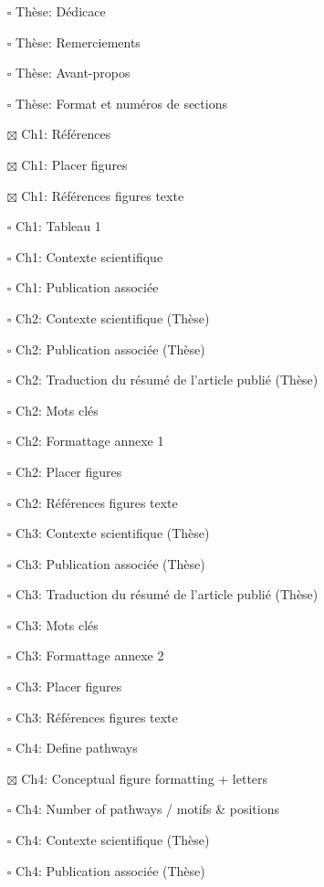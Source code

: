 \begin{itemize}
\tightlist
\item[$\square$]
  Thèse: Dédicace
\item[$\square$]
  Thèse: Remerciements
\item[$\square$]
  Thèse: Avant-propos
\item[$\square$]
  Thèse: Format et numéros de sections
\item[$\boxtimes$]
  Ch1: Références
\item[$\boxtimes$]
  Ch1: Placer figures
\item[$\boxtimes$]
  Ch1: Références figures texte
\item[$\square$]
  Ch1: Tableau 1
\item[$\square$]
  Ch1: Contexte scientifique
\item[$\square$]
  Ch1: Publication associée
\item[$\square$]
  Ch2: Contexte scientifique (Thèse)
\item[$\square$]
  Ch2: Publication associée (Thèse)
\item[$\square$]
  Ch2: Traduction du résumé de l'article publié (Thèse)
\item[$\square$]
  Ch2: Mots clés
\item[$\square$]
  Ch2: Formattage annexe 1
\item[$\square$]
  Ch2: Placer figures
\item[$\square$]
  Ch2: Références figures texte
\item[$\square$]
  Ch3: Contexte scientifique (Thèse)
\item[$\square$]
  Ch3: Publication associée (Thèse)
\item[$\square$]
  Ch3: Traduction du résumé de l'article publié (Thèse)
\item[$\square$]
  Ch3: Mots clés
\item[$\square$]
  Ch3: Formattage annexe 2
\item[$\square$]
  Ch3: Placer figures
\item[$\square$]
  Ch3: Références figures texte
\item[$\square$]
  Ch4: Define pathways
\item[$\boxtimes$]
  Ch4: Conceptual figure formatting + letters
\item[$\square$]
  Ch4: Number of pathways / motifs \& positions
\item[$\square$]
  Ch4: Contexte scientifique (Thèse)
\item[$\square$]
  Ch4: Publication associée (Thèse)

\end{itemize}
